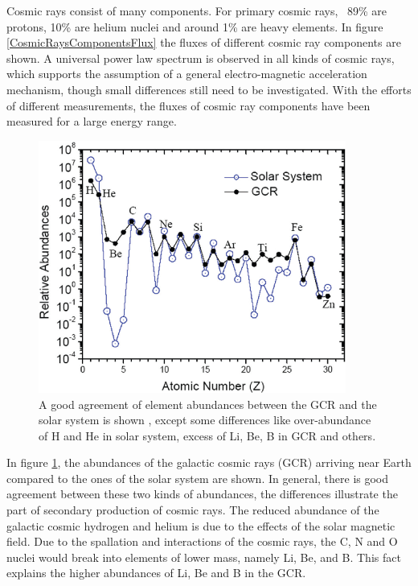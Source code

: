 Cosmic rays consist of many components. For primary cosmic rays, ~89\% are protons, 10\% are helium nuclei and around 1\% are heavy elements. In figure \ref{CosmicRaysComponentsFlux} the fluxes of different cosmic ray components are shown. A universal power law spectrum is observed in all kinds of cosmic rays, which supports the assumption of a general electro-magnetic acceleration mechanism, though small differences still need to be investigated. With the efforts of different measurements, the fluxes of cosmic ray components have been measured for a large energy range.     \par

\begin{figure}[h] 
\centering
\includegraphics[width=0.9\textwidth, height=0.45\textheight ]{Figures/chapter2/Cosmicrays/Galactic-cosmic-ray-relative-abundances-compared-with-the-Solar-System-ones-The-curves.png}
\caption[Element abundances between the GCR and the solar system]{A good agreement of element abundances between the GCR and the solar system is shown \cite{ElementAbundanceOfCosmicRays_OriginalACE}, except some differences like over-abundance of H and He in solar system, excess of Li, Be, B in GCR and others.}
\label{ElementAbundanceOfCosmicRays}
\end{figure}

% 
In figure \ref{ElementAbundanceOfCosmicRays}, the abundances of the galactic cosmic rays (GCR) arriving near Earth compared to the ones of the solar system are shown. In general, there is good agreement between these two kinds of abundances, the differences illustrate the part of secondary production of cosmic rays. The reduced abundance of the galactic cosmic hydrogen and helium is due to the effects of the solar magnetic field. Due to the spallation and interactions of the cosmic rays, the C, N and O nuclei would break into elements of lower mass, namely Li, Be, and B. This fact explains the higher abundances of Li, Be and B in the GCR.  





